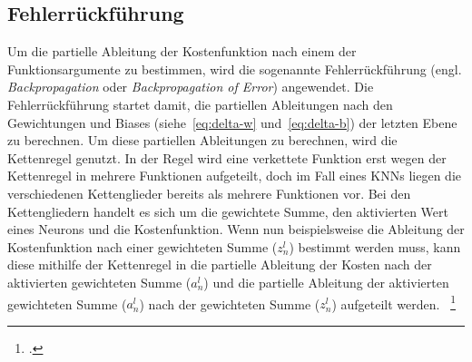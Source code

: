 \subsection{Fehlerrückführung}\label{subsec:fehlerruckfuhrung}
Um die partielle Ableitung der Kostenfunktion nach einem der Funktionsargumente zu bestimmen, wird die sogenannte Fehlerrückführung (engl. \textit{Backpropagation} oder \textit{Backpropagation of Error}) angewendet.
Die Fehlerrückführung startet damit, die partiellen Ableitungen nach den Gewichtungen und Biases (siehe~\eqref{eq:delta-w} und~\eqref{eq:delta-b}) der letzten Ebene zu berechnen.
Um diese partiellen Ableitungen zu berechnen, wird die Kettenregel genutzt.
In der Regel wird eine verkettete Funktion erst wegen der Kettenregel in mehrere Funktionen aufgeteilt, doch im Fall eines KNNs liegen die verschiedenen Kettenglieder bereits als mehrere Funktionen vor.
Bei den Kettengliedern handelt es sich um die gewichtete Summe, den aktivierten Wert eines Neurons und die Kostenfunktion.
Wenn nun beispielsweise die Ableitung der Kostenfunktion nach einer gewichteten Summe ($z^l_n$) bestimmt werden muss, kann diese mithilfe der Kettenregel in die partielle Ableitung der Kosten nach der aktivierten gewichteten Summe ($a^l_n$) und die partielle Ableitung der aktivierten gewichteten Summe ($a^l_n$) nach der gewichteten Summe ($z^l_n$) aufgeteilt werden.
~\footcite{3b1b-3}

